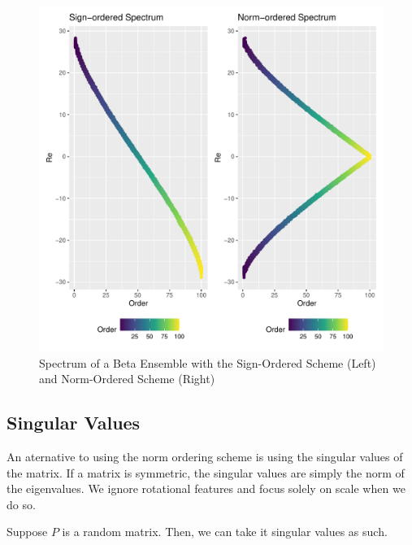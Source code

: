 \begin{figure}[h]
 \begin{center}
  \includegraphics[scale = 0.7]{../graphics/chap2/2-2-1_orderscheme}
  \caption{Spectrum of a Beta Ensemble with the Sign-Ordered Scheme (Left) and Norm-Ordered Scheme (Right)}
 \end{center}
 \label{orderscheme_plot}
\end{figure}


\subsection{Singular Values}

An aternative to using the norm ordering scheme is using the singular values of the matrix. If a matrix is symmetric, the singular values are simply the norm of the eigenvalues. We ignore rotational features and focus solely on scale when we do so.

Suppose $P$ is a random matrix. Then, we can take it singular values as such.

